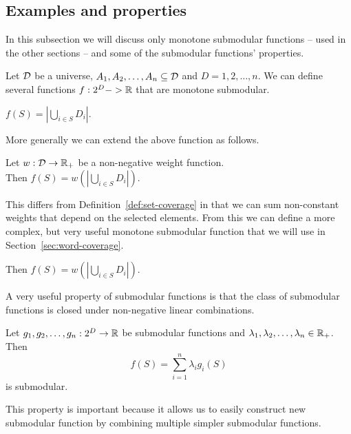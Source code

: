 
\subsection{Examples and properties}

In this subsection we will discuss only monotone submodular functions --
used in the other sections -- and some of the submodular functions'
properties.

Let \(\mathcal{D}\) be a universe, \(A_1, A_2, \ldots, A_n \subseteq \mathcal{D}\) and \(D = {1,
2, \dots, n}\). We can define several functions \(f : 2^D -> \mathbb{R}\) that are
monotone submodular. 
\begin{definition}
  \label{def:set-coverage}
  \(f(S) = |\bigcup_{i \in S} D_i|\).
\end{definition}
More generally we can extend the above function as follows.
\begin{definition}
  \label{def:weighted-coverage}
  Let \(w : \mathcal{D} \to \mathbb{R}_+\) be a non-negative weight function. \\
  Then \(f(S) = w(|\bigcup_{i \in S} D_i|)\).
\end{definition}
This differs from Definition~\vref{def:set-coverage} in that we can sum
non-constant weights that depend on the selected elements. From this we can
define a more complex, but very useful monotone submodular function that we will
use in Section~\vref{sec:word-coverage}.
\begin{definition}
  \label{def:-coverage}
  Then \(f(S) = w(|\bigcup_{i \in S} D_i|)\).
\end{definition}

A very useful property of submodular functions is that the class of submodular
functions is closed under non-negative linear combinations. 
\begin{proposition}
  Let \(g_1, g_2, \ldots, g_n : 2^D \to \mathbb{R} \) be submodular functions and \(\lambda_1, \lambda_2, \ldots, \lambda_n \in \mathbb{R}_+\). \\
  Then
  \[f(S) = \sum_{i=1}^n \lambda_i g_i(S)\]
  is submodular.
\end{proposition}
This property is important because it allows us to easily construct new
submodular function by combining multiple simpler submodular functions.

